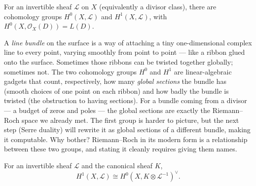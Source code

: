 \begin{definition}
\label{def:sheaf-cohomology-rs}
For an invertible sheaf \(\mathcal{L}\) on \(X\) (equivalently a divisor
class), there are cohomology groups \(H^{0}(X,\mathcal{L})\) and
\(H^{1}(X,\mathcal{L})\), with \(H^{0}(X,\mathcal{O}_X(D))=L(D)\).
\leanok
\end{definition}

\begin{layman}
A \emph{line bundle} on the surface is a way of attaching a tiny
one-dimensional complex line to every point, varying smoothly from point
to point — like a ribbon glued onto the surface. Sometimes those ribbons
can be twisted together globally; sometimes not. The two cohomology
groups \(H^0\) and \(H^1\) are linear-algebraic gadgets that count,
respectively, how many \emph{global sections} the bundle has (smooth
choices of one point on each ribbon) and how badly the bundle is twisted
(the obstruction to having sections). For a bundle coming from a
divisor — a budget of zeros and poles — the global sections are exactly
the Riemann–Roch space we already met. The first group is harder to
picture, but the next step (Serre duality) will rewrite it as global
sections of a different bundle, making it computable. Why bother?
Riemann–Roch in its modern form is a relationship between these two
groups, and stating it cleanly requires giving them names.
\end{layman}

\begin{theorem}
\label{thm:serre-duality-rs}
For an invertible sheaf \(\mathcal{L}\) and the canonical sheaf \(K\),
\[
  H^{1}(X,\mathcal{L})\cong H^{0}(X,K\otimes\mathcal{L}^{-1})^{\vee}.
\]
\notready
\end{theorem}

